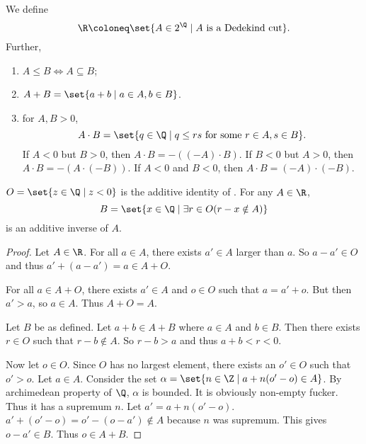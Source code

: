 \begin{definition}[\R] \label{def:R:dedekind}
    We define \[
        \R \coloneq \set{A \in 2^\Q \mid A \text{ is a Dedekind cut}}.
    \] Further,
    \begin{enumerate}
        \item $A \le B \iff A \subseteq B$;
        \item $A + B = \set{a + b \mid a \in A, b \in B}$.
        \item for $A, B > 0$, \[
            A \cdot B = \set{q \in \Q \mid q \le rs \text{ for some }
                r \in A, s \in B}.
        \] If $A < 0$ but $B > 0$, then $A \cdot B = -((-A) \cdot B)$.
        If $B < 0$ but $A > 0$, then $A \cdot B = -(A \cdot (-B))$.
        If $A < 0$ and $B < 0$, then $A \cdot B = (-A) \cdot (-B)$.
    \end{enumerate}
\end{definition}

\begin{proposition} \label{thm:R:dedekind:negative}
    $O = \set{z \in \Q \mid z < 0}$ is the additive identity of \R.
    For any $A \in \R$, \[
        B = \set{x \in \Q \mid \exists r \in O (r - x \notin A)}
    \] is an additive inverse of $A$.
\end{proposition}
\begin{proof}
    Let $A \in \R$.
    For all $a \in A$, there exists $a' \in A$ larger than $a$.
    So $a - a' \in O$ and thus $a' + (a - a') = a \in A + O$.

    For all $a \in A + O$, there exists $a' \in A$ and $o \in O$ such that
    $a = a' + o$.
    But then $a' > a$, so $a \in A$.
    Thus $A + O = A$.

    Let $B$ be as defined.
    Let $a + b \in A + B$ where $a \in A$ and $b \in B$.
    Then there exists $r \in O$ such that $r - b \notin A$.
    So $r - b > a$ and thus $a + b < r < 0$.

    Now let $o \in O$.
    Since $O$ has no largest element, there exists an $o' \in O$ such that
    $o' > o$.
    Let $a \in A$.
    Consider the set $\alpha = \set{n \in \Z \mid a + n(o' - o) \in A}$.
    By archimedean property of $\Q$, $\alpha$ is bounded.
    It is obviously non-empty fucker.
    Thus it has a supremum $n$.
    Let $a' = a + n(o' - o)$.
    $a' + (o' - o) = o' - (o - a') \notin A$ because $n$ was supremum.
    This gives $o - a' \in B$.
    Thus $o \in A + B$.
\end{proof}
